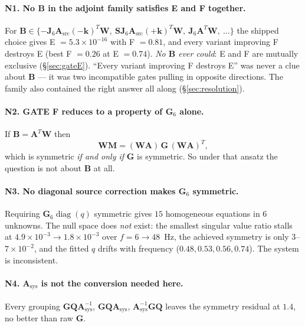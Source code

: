 \documentclass[11pt,a4paper]{article}
\newcommand{\bJ}{\mathbf{J}}
\newcommand{\bW}{\mathbf{W}}
\newcommand{\bQ}{\mathbf{Q}}
\newcommand{\bA}{\mathbf{A}}
\newcommand{\bB}{\mathbf{B}}
\newcommand{\bG}{\mathbf{G}}
\newcommand{\bM}{\mathbf{M}}
\newcommand{\bS}{\mathbf{S}}
\newcommand{\Asys}{\mathbf{A}_{\text{sys}}}
\begin{document}
\paragraph{N1. No $\bB$ in the adjoint family satisfies E and F together.}
For $\bB \in \{-\bJ_6\bA_{\text{src}}(-\mathbf{k})^{T}\bW,\
\bS\bJ_6\bA_{\text{src}}(+\mathbf{k})^{T}\bW,\ \bJ_6\bA^{T}\bW,\ \dots\}$ the
shipped choice gives E $=5.3\times10^{-16}$ with F $=0.81$, and every variant
improving F destroys E (best F $=0.26$ at E $=0.74$).
\emph{No $\bB$ ever could}: E and F are mutually exclusive (\S\ref{sec:gateE}).
``Every variant improving F destroys E'' was never a clue about $\bB$ --- it was
two incompatible gates pulling in opposite directions.  The family also
contained the right answer all along (\S\ref{sec:resolution}).

\paragraph{N2. GATE F reduces to a property of $\bG_6$ alone.}
If $\bB = \bA^{T}\bW$ then
\begin{equation}\label{eq:reduction}
  \bW\bM = (\bW\bA)\,\bG\,(\bW\bA)^{T},
\end{equation}
which is symmetric \emph{if and only if} $\bG$ is symmetric.  So under that
ansatz the question is not about $\bB$ at all.

\paragraph{N3. No diagonal source correction makes $\bG_6$ symmetric.}
Requiring $\bG_6\operatorname{diag}(q)$ symmetric gives $15$ homogeneous
equations in $6$ unknowns.  The null space does \emph{not} exist: the smallest
singular value ratio stalls at $4.9\times10^{-3}\to1.8\times10^{-3}$ over
$f=6\to48$~Hz, the achieved symmetry is only $3$--$7\times10^{-2}$, and the
fitted $q$ drifts with frequency ($0.48, 0.53, 0.56, 0.74$).  The system is
inconsistent.

\paragraph{N4. $\Asys$ is not the conversion needed here.}
Every grouping $\bG\bQ\Asys^{-1}$, $\bG\bQ\Asys$, $\Asys^{-1}\bG\bQ$ leaves the
symmetry residual at $1.4$, no better than raw $\bG$.
\end{document}
